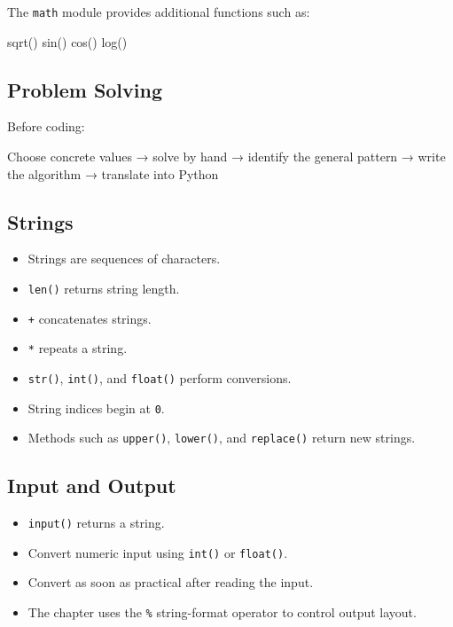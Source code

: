\documentclass[
]{article}
\newenvironment{Shaded}{\begin{snugshade}}{\end{snugshade}}
\newcommand{\NormalTok}[1]{#1}
\providecommand{\tightlist}{%
  \setlength{\itemsep}{0pt}\setlength{\parskip}{0pt}}
\begin{document}
The \texttt{math} module provides additional functions such as:

\begin{Shaded}
\begin{Highlighting}[]
\NormalTok{sqrt()}
\NormalTok{sin()}
\NormalTok{cos()}
\NormalTok{log()}
\end{Highlighting}
\end{Shaded}

\subsection{Problem Solving}\label{problem-solving}

Before coding:

\begin{Shaded}
\begin{Highlighting}[]
\NormalTok{Choose concrete values}
\NormalTok{→ solve by hand}
\NormalTok{→ identify the general pattern}
\NormalTok{→ write the algorithm}
\NormalTok{→ translate into Python}
\end{Highlighting}
\end{Shaded}

\subsection{Strings}\label{strings-1}

\begin{itemize}
\tightlist
\item
  Strings are sequences of characters.
\item
  \texttt{len()} returns string length.
\item
  \texttt{+} concatenates strings.
\item
  \texttt{*} repeats a string.
\item
  \texttt{str()}, \texttt{int()}, and \texttt{float()} perform
  conversions.
\item
  String indices begin at \texttt{0}.
\item
  Methods such as \texttt{upper()}, \texttt{lower()}, and
  \texttt{replace()} return new strings.
\end{itemize}

\subsection{Input and Output}\label{input-and-output-1}

\begin{itemize}
\tightlist
\item
  \texttt{input()} returns a string.
\item
  Convert numeric input using \texttt{int()} or \texttt{float()}.
\item
  Convert as soon as practical after reading the input.
\item
  The chapter uses the \texttt{\%} string-format operator to control
  output layout.
\end{itemize}
\end{document}
